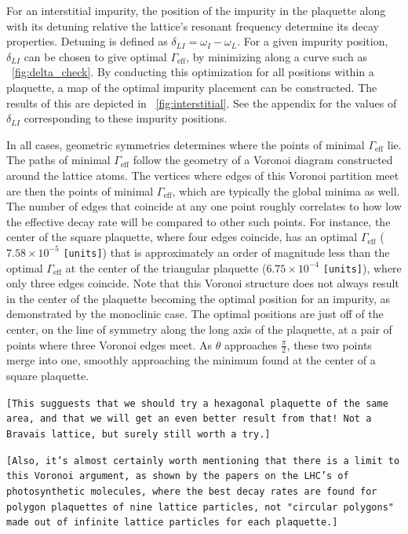 \documentclass[aps,pra,superscriptaddress,twocolumn]{revtex4-1}
\newcommand{\fref}[1]{\text{Fig.}~\ref{#1}}
\newcommand{\commentSB}[1]{\texttt{\color{blue}[#1]}}
\begin{document}
For an interstitial impurity, the position of the impurity in the plaquette along with its detuning relative the lattice's resonant frequency determine its decay properties. Detuning is defined as $ \delta_{LI} = \omega_I - \omega_L$. For a given impurity position, $\delta_{LI}$ can be chosen to give optimal $\Gamma_\text{eff}$, by minimizing along a curve such as \fref{fig:delta_check}. By conducting this optimization for all positions within a plaquette, a map of the optimal impurity placement can be constructed. The results of this are depicted in \fref{fig:interstitial}. See the appendix for the values of $\delta_{LI}$ corresponding to these impurity positions. 



In all cases, geometric symmetries determines where the points of minimal $\Gamma_\text{eff}$ lie. The paths of minimal $\Gamma_\text{eff}$ follow the geometry of a Voronoi diagram constructed around the lattice atoms. The vertices where edges of this Voronoi partition meet are then the points of minimal $\Gamma_\text{eff}$, which are typically the global minima as well. The number of edges that coincide at any one point roughly correlates to how low the effective decay rate will be compared to other such points. For instance, the center of the square plaquette, where four edges coincide, has an optimal $\Gamma_\text{eff}$ ($7.58\times 10^{-5}$ \commentSB{units}) that is approximately an order of magnitude less than the optimal $\Gamma_\text{eff}$ at the center of the triangular plaquette ($6.75\times 10^{-4}$ \commentSB{units}), where only three edges coincide. Note that this Voronoi structure does not always result in the center of the plaquette becoming the optimal position for an impurity, as demonstrated by the monoclinic case. The optimal positions are just off of the center, on the line of symmetry along the long axis of the plaquette, at a pair of points where three Voronoi edges meet. As $\theta$ approaches $\frac{\pi}{2}$, these two points merge into one, smoothly approaching the minimum found at the center of a square plaquette.

\commentSB{This sugguests that we should try a hexagonal plaquette of the same area, and that we will get an even better result from that! Not a Bravais lattice, but surely still worth a try.}

\commentSB{Also, it's almost certainly worth mentioning that there is a limit to this Voronoi argument, as shown by the papers on the LHC's of photosynthetic molecules, where the best decay rates are found for polygon plaquettes of nine lattice particles, not "circular polygons" made out of infinite lattice particles for each plaquette.}
\end{document}

